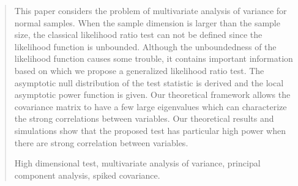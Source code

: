 \documentclass[12pt]{article} %
\renewcommand{\theequation}{\thesection\arabic{equation}}
\theoremstyle{definition}
\begin{document}
\begin{quotation}
This paper considers the problem of multivariate analysis of variance for normal samples.
    When the sample dimension is larger than the sample size, the classical likelihood ratio test can not be defined since the likelihood function is unbounded.
    Although the unboundedness of the likelihood function causes some trouble, it contains important information based on which we propose a generalized likelihood ratio test.
    The asymptotic null distribution of the test statistic is derived and the local asymptotic power function is given.
    Our theoretical framework allows the covariance matrix to have a few large eigenvalues which can characterize the strong correlations between variables.
    Our theoretical results and simulations show that the proposed test has particular high power when there are strong correlation between variables.

\vspace{9pt}
    High dimensional test, multivariate analysis of variance, principal component analysis, spiked covariance.
\par
\end{quotation}\par



\def\thefigure{\arabic{figure}}
\def\thetable{\arabic{table}}

\renewcommand{\theequation}{\thesection.\arabic{equation}}


\fontsize{12}{14pt plus.8pt minus .6pt}\selectfont

\setcounter{section}{1} %
\setcounter{equation}{0} %
\end{document}

